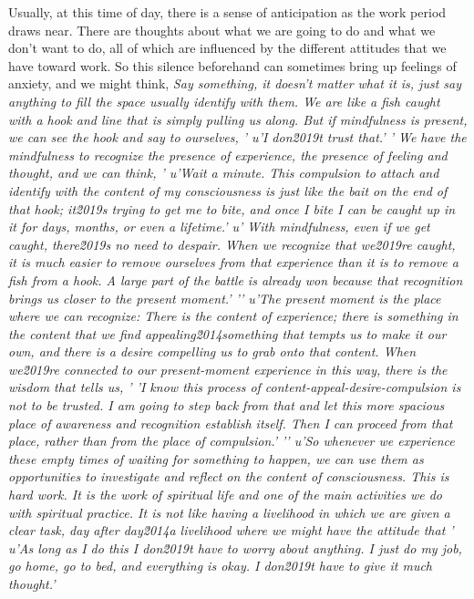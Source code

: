 Usually, at this time of day, there is a sense of anticipation as the 
work period draws near. There are thoughts about what we are going to 
do and what we don't want to do, all of which are influenced by the 
different attitudes that we have toward work. So this silence 
beforehand can sometimes bring up feelings of anxiety, and we might 
think, \emph{Say something, it doesn't matter what it is, just say 
anything to fill the space usually identify with them. We are like a fish caught with a hook and line that is simply pulling us along. But if mindfulness is present, we can see the hook and say to ourselves, '
u'I don\u2019t trust that.'
' We have the mindfulness to recognize the presence of experience, the presence of feeling and thought, and we can think, '
u'Wait a minute. This compulsion to attach and identify with the content of my consciousness is just like the bait on the end of that hook; it\u2019s trying to get me to bite, and once I bite I can be caught up in it for days, months, or even a lifetime.'
u' With mindfulness, even if we get caught, there\u2019s no need to despair. When we recognize that we\u2019re caught, it is much easier to remove ourselves from that experience than it is to remove a fish from a hook. A large part of the battle is already won because that recognition brings us closer to the present moment.'
'\n'
u'The present moment is the place where we can recognize: There is the content of experience; there is something in the content that we find appealing\u2014something that tempts us to make it our own, and there is a desire compelling us to grab onto that content. When we\u2019re connected to our present-moment experience in this way, there is the wisdom that tells us, '
'I know this process of content-appeal-desire-compulsion is not to be trusted. I am going to step back from that and let this more spacious place of awareness and recognition establish itself. Then I can proceed from that place, rather than from the place of compulsion.'
'\n'
u'So whenever we experience these empty times of waiting for something to happen, we can use them as opportunities to investigate and reflect on the content of consciousness. This is hard work. It is the work of spiritual life and one of the main activities we do with spiritual practice. It is not like having a livelihood in which we are given a clear task, day after day\u2014a livelihood where we might have the attitude that '
u'As long as I do this I don\u2019t have to worry about anything. I just do my job, go home, go to bed, and everything is okay. I don\u2019t have to give it much thought.'
}
